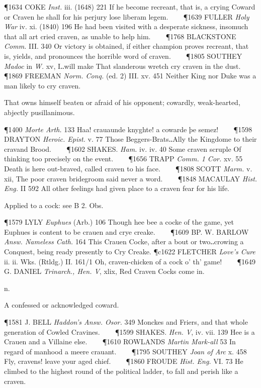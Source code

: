 \begin{description}[wide, labelwidth=!, labelindent=0pt]
\begin{myenumerate}
\P 1634 COKE  \textit{Inst.} iii. (1648) 221 If he become recreant, that is, a crying Coward or Craven he shall for his perjury lose liberam legem.    
\P 1639 FULLER  \textit{Holy War} iv. xi. (1840) 196 He had been visited with a desperate sickness, insomuch that all art cried craven, as unable to help him.    
\P 1768 BLACKSTONE  \textit{Comm.} III. 340 Or victory is obtained, if either champion proves recreant, that is, yields, and pronounces the horrible word of craven.    
\P 1805 SOUTHEY \textit{Madoc} in  \textit{W.} xv, I‥will make That slanderous wretch cry craven in the dust.    
\P 1869 FREEMAN  \textit{Norm. Conq.} (ed. 2) III. xv. 451 Neither King nor Duke was a man likely to cry craven.

 That owns himself beaten or afraid of his opponent; cowardly, weak-hearted, abjectly pusillanimous.

\P 1400  \textit{Morte Arth.} 133 Haa! crauaunde knyghte! a cowarde þe semez!    
\P 1598 DRAYTON  \textit{Heroic. Epist.} v. 77 Those Beggers-Brats‥Ally the Kingdome to their cravand Brood.    
\P 1602 SHAKES.  \textit{Ham.} iv. iv. 40 Some craven scruple Of thinking too precisely on the event.    
\P 1656 TRAPP  \textit{Comm. 1 Cor.} xv. 55 Death is here out-braved, called craven to his face.    
\P 1808 SCOTT  \textit{Marm.} v. xii, The poor craven bridegroom said never a word.    
\P 1848 MACAULAY  \textit{Hist. Eng.} II 592 All other feelings had given place to a craven fear for his life.

 Applied to a cock: see B 2. Obs.

\P 1579 LYLY  \textit{Euphues} (Arb.) 106 Though hee bee a cocke of the game, yet Euphues is content to be crauen and crye creake.    
\P 1609 BP. W. BARLOW  \textit{Answ. Nameless Cath.} 164 This Crauen Cocke, after a bout or two‥crowing a Conquest, being ready presently to Cry Creake.
\P c1622 FLETCHER  \textit{Love's Cure} ii. ii. Wks. (Rtldg.) II. 161/1 Oh, craven-chicken of a cock o' th' game!    
\P 1649 G. DANIEL  \textit{Trinarch., Hen. V}, xlix, Red Craven Cocks come in.

 n.

 A confessed or acknowledged coward.

\P 1581 J. BELL  \textit{Haddon's Answ. Osor.} 349 Monckes and Friers, and that whole generation of Cowled Cravines.    
\P 1599 SHAKES.  \textit{Hen. V}, iv. vii. 139 Hee is a Crauen and a Villaine else.    
\P 1610 ROWLANDS  \textit{Martin Mark-all} 53 In regard of manhood a meere crauant.    
\P 1795 SOUTHEY  \textit{Joan of Arc} x. 458 Fly, cravens! leave your aged chief.    
\P 1860 FROUDE  \textit{Hist. Eng.} VI. 73 He climbed to the highest round of the political ladder, to fall and perish like a craven.


\end{myenumerate}
\end{description}
